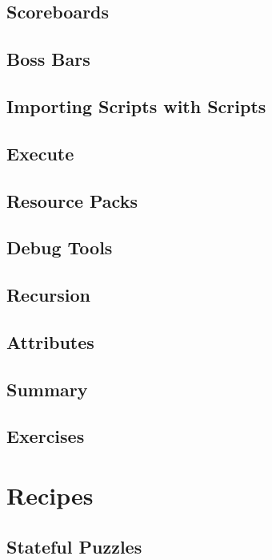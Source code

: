 \documentclass[oneside]{book}
\begin{document}
\section{Scoreboards}
\blindtext

\section{Boss Bars}
\blindtext

\section{Importing Scripts with Scripts}
\blindtext

\section{Execute}
\blindtext

\section{Resource Packs}
\blindtext

\section{Debug Tools}
\blindtext

\section{Recursion}
\blindtext

\section{Attributes}
\blindtext

\section{Summary}
\blindtext

\section{Exercises}
\blindtext

\chapter{Recipes}

\section{Stateful Puzzles}
\blindtext
\end{document}
